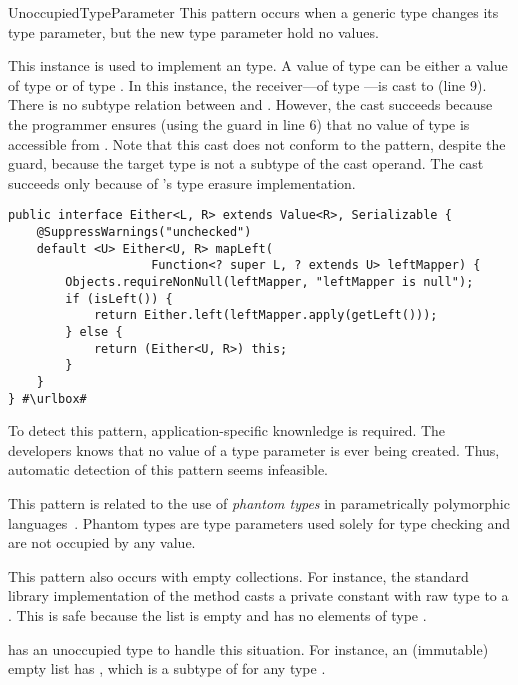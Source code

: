 \begin{pattern}{UnoccupiedTypeParameter}
This pattern occurs when a generic type changes its type parameter,
but the new type parameter hold no values.

\instances{}
This instance is used to implement an  type.
A value of type  can be either a value of type  or of type .
In this instance, the receiver---of type ---is cast to  (line 9).
There is no subtype relation between  and .
However, the cast succeeds because the programmer ensures
(using the guard  in line 6)
that no value of type  is accessible from .
Note that this cast does not conform to the 
pattern, despite the guard, because the target type is not a subtype of the
cast operand.
The cast succeeds only because of \java{}'s type erasure
implementation.

\def\urlvar{http://bit.ly/vavr_io_vavr_2SMIfI2}
\begin{verbatim}
public interface Either<L, R> extends Value<R>, Serializable {
    @SuppressWarnings("unchecked")
    default <U> Either<U, R> mapLeft(
                    Function<? super L, ? extends U> leftMapper) {
        Objects.requireNonNull(leftMapper, "leftMapper is null");
        if (isLeft()) {
            return Either.left(leftMapper.apply(getLeft()));
        } else {
            return (Either<U, R>) this;
        }
    }
} #\urlbox#
\end{verbatim}


\detection{}
To detect this pattern, application-specific knownledge is required.
The developers knows that no value of a type parameter is ever being created. 
Thus, automatic detection of this pattern seems infeasible.

\issues{}
This pattern is related to the use of \emph{phantom types} in parametrically polymorphic languages~\citep{LeijenMeijer99,cheneyHinzePhantomTypes}.
Phantom types are type parameters used solely for type checking and are not occupied by any value.

This pattern also occurs with empty collections.
For instance, the \java{} standard library implementation of the method  casts a private constant with raw type  to a .
This is safe because the list is empty and has no elements of type .

\scala{} has an unoccupied  type to handle this situation.
For instance, an (immutable) empty list has ,
which is a subtype of  for any type .

\end{pattern}